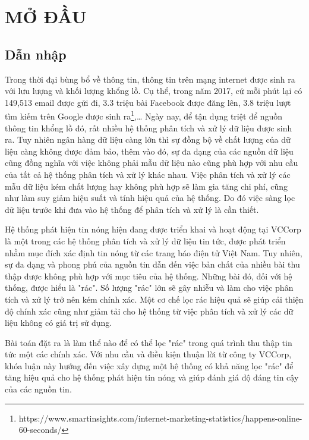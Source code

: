 \chapter{MỞ ĐẦU}
\ifpdf
    \graphicspath{{Chapter1/Chapter1Figs/PNG/}{Chapter1/Chapter1Figs/PDF/}{Chapter1/Chapter1Figs/}}
\else
    \graphicspath{{Chapter1/Chapter1Figs/EPS/}{Chapter1/Chapter1Figs/}}
\fi

\section{Dẫn nhập}
Trong thời đại bùng bổ về thông tin, thông tin trên mạng internet được sinh ra với lưu lượng và khối lượng khổng lồ. Cụ thể, trong năm 2017, cứ mỗi phút lại có 149,513 email được gửi đi, 3.3 triệu bài Facebook được đăng lên, 3.8 triệu lượt tìm kiếm trên Google được sinh ra\footnote{https://www.smartinsights.com/internet-marketing-statistics/happens-online-60-seconds/},… Ngày nay, để tận dụng triệt để nguồn thông tin khổng lồ đó, rất nhiều hệ thống phân tích và xử lý dữ liệu được sinh ra. Tuy nhiên ngân hàng dữ liệu càng lớn thì sự đồng bộ về chất lượng của dữ liệu càng không được đảm bảo, thêm vào đó, sự đa dạng của các nguồn dữ liệu cũng đồng nghĩa với việc không phải mẫu dữ liệu nào cũng phù hợp với nhu cầu của tất cả hệ thống phân tích và xử lý khác nhau. Việc phân tích và xử lý các mẫu dữ liệu kém chất lượng hay không phù hợp sẽ làm gia tăng chi phí, cũng như làm suy giảm hiệu suất và tính hiệu quả của hệ thống. Do đó việc sàng lọc dữ liệu trước khi đưa vào hệ thống để phân tích và xử lý là cần thiết.

Hệ thống phát hiện tin nóng hiện đang được triển khai và hoạt động tại VCCorp là một trong các hệ thống phân tích và xử lý dữ liệu tin tức, được phát triển nhằm mục đích xác định tin nóng từ các trang báo điện tử Việt Nam. Tuy nhiên, sự đa dạng và phong phú của nguồn tin dẫn đến việc bản chất của nhiều bài thu thập được không phù hợp với mục tiêu của hệ thống. Những bài đó, đối với hệ thống, được hiểu là "rác". Số lượng "rác" lớn sẽ gây nhiễu và làm cho việc phân tích và xử lý trở nên kém chính xác. Một cơ chế lọc rác hiệu quả sẽ giúp cải thiện độ chính xác cũng như giảm tải cho hệ thống từ việc phân tích và xử lý các dữ liệu không có giá trị sử dụng.

Bài toán đặt ra là làm thể nào để có thể lọc "rác" trong quá trình thu thập tin tức một các chính xác. Với nhu cầu và điều kiện thuận lời từ công ty VCCorp, khóa luận này hướng đến việc xây dựng một hệ thống có khả năng lọc "rác" để tăng hiệu quả cho hệ thống phát hiện tin nóng và giúp đánh giá độ đáng tin cậy của các nguồn tin.

